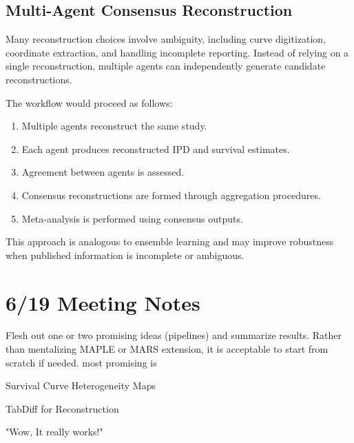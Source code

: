 \documentclass[11pt]{article}
\begin{document}
\subsection{Multi-Agent Consensus Reconstruction}

Many reconstruction choices involve ambiguity, including curve digitization, coordinate extraction, and handling incomplete reporting. Instead of relying on a single reconstruction, multiple agents can independently generate candidate reconstructions.

The workflow would proceed as follows:

\begin{enumerate}
\item Multiple agents reconstruct the same study.
\item Each agent produces reconstructed IPD and survival estimates.
\item Agreement between agents is assessed.
\item Consensus reconstructions are formed through aggregation procedures.
\item Meta-analysis is performed using consensus outputs.
\end{enumerate}

This approach is analogous to ensemble learning and may improve robustness when published information is incomplete or ambiguous.

\section{6/19 Meeting Notes}

Flesh out one or two promising ideas (pipelines) and summarize results. Rather than mentalizing MAPLE or MARS extension, it is acceptable to start from scratch if needed. most promising is 

Survival Curve Heterogeneity Maps

TabDiff for Reconstruction

"Wow, It really works!"
\end{document}
